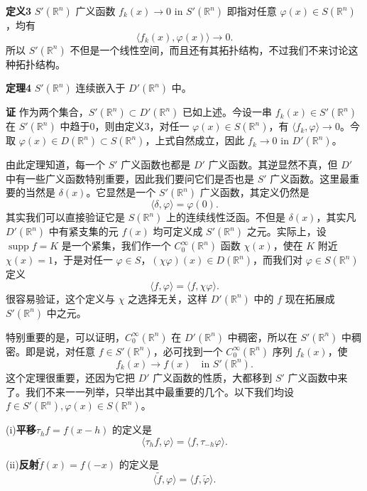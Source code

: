 \noindent\textbf{定义3}\quad
$S'(\mathbb R^n)$ 广义函数 $f_k(x)\to0$ in $S'(\mathbb R^n)$ 即指对任意 $\varphi(x)\in S(\mathbb R^n)$，均有
\[
 \langle f_k(x),\varphi(x)\rangle\to0.
\]
所以 $S'(\mathbb R^n)$ 不但是一个线性空间，而且还有其拓扑结构，不过我们不来讨论这种拓扑结构。

\noindent\textbf{定理4}\quad
$S'(\mathbb R^n)$ 连续嵌入于 $D'(\mathbb R^n)$ 中。

\noindent\textbf{证}\quad
作为两个集合，$S'(\mathbb R^n)\subset D'(\mathbb R^n)$ 已如上述。今设一串 $f_k(x)\in S'(\mathbb R^n)$ 在 $S'(\mathbb R^n)$ 中趋于0，则由定义3，对任一 $\varphi(x)\in S(\mathbb R^n)$，有 $\langle f_k,\varphi\rangle\to0$。今取 $\varphi(x)\in D(\mathbb R^n)\subset S(\mathbb R^n)$，上式自然成立，因此 $f_k\to0$ in $D'(\mathbb R^n)$。

由此定理知道，每一个 $S'$ 广义函数也都是 $D'$ 广义函数。其逆显然不真，但 $D'$ 中有一些广义函数特别重要，因此我们要问它们是否也是 $S'$ 广义函数。这里最重要的当然是 $\delta(x)$。它显然是一个 $S'(\mathbb R^n)$ 广义函数，其定义仍然是
\[
 \langle\delta,\varphi\rangle=\varphi(0).
\]
其实我们可以直接验证它是 $S(\mathbb R^n)$ 上的连续线性泛函。不但是 $\delta(x)$，其实凡 $D'(\mathbb R^n)$ 中有紧支集的元 $f(x)$ 均可定义成 $S'(\mathbb R^n)$ 之元。实际上，设 $\operatorname{supp}f=K$ 是一个紧集，我们作一个 $C_0^\infty(\mathbb R^n)$ 函数 $\chi(x)$，使在 $K$ 附近 $\chi(x)=1$，于是对任一 $\varphi\in S$，$(\chi\varphi)(x)\in D(\mathbb R^n)$，而我们对 $\varphi\in S(\mathbb R^n)$ 定义
\[
 \langle f,\varphi\rangle=\langle f,\chi\varphi\rangle.
\]
很容易验证，这个定义与 $\chi$ 之选择无关，这样 $D'(\mathbb R^n)$ 中的 $f$ 现在拓展成 $S'(\mathbb R^n)$ 中之元。

特别重要的是，可以证明，$C_0^\infty(\mathbb R^n)$ 在 $D'(\mathbb R^n)$ 中稠密，所以在 $S'(\mathbb R^n)$ 中稠密。即是说，对任意 $f\in S'(\mathbb R^n)$，必可找到一个 $C_0^\infty(\mathbb R^n)$ 序列 $f_k(x)$，使
\[
 f_k(x)\to f(x)\quad\text{in }S'(\mathbb R^n).
\]
这个定理很重要，还因为它把 $D'$ 广义函数的性质，大都移到 $S'$ 广义函数中来了。我们不来一一列举，只举出其中最重要的几个。以下我们均设 $f\in S'(\mathbb R^n),\varphi(x)\in S(\mathbb R^n)$。

(i)\textbf{平移}\quad $\tau_hf=f(x-h)$ 的定义是
\begin{equation}
 \langle\tau_hf,\varphi\rangle=\langle f,\tau_{-h}\varphi\rangle.
 \tag{21}
\end{equation}

(ii)\textbf{反射}\quad $\widetilde f(x)=f(-x)$ 的定义是
\begin{equation}
 \langle\widetilde f,\varphi\rangle=\langle f,\widetilde\varphi\rangle.
 \tag{22}
\end{equation}

